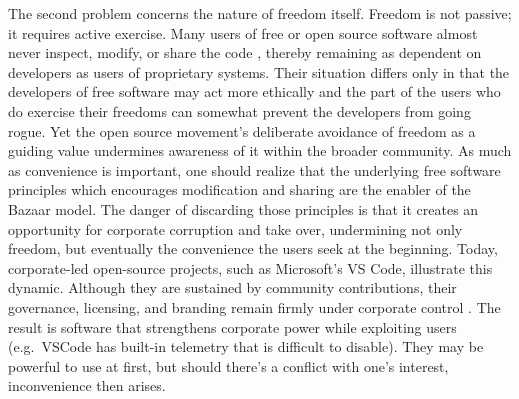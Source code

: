 \documentclass[10pt]{article}
\begin{document}
The second problem concerns the nature of freedom itself. Freedom is not
passive; it requires active exercise. Many users of free or open source
software almost never inspect, modify, or share the code
\cite{open.source.contrib}, thereby remaining as dependent on developers as
users of proprietary systems. Their situation differs only in that the
developers of free software may act more ethically and the part of the users
who do exercise their freedoms can somewhat prevent the developers from going
rogue. Yet the open source movement's deliberate avoidance of freedom as a
guiding value undermines awareness of it within the broader community.  As much
as convenience is important, one should realize that the underlying free
software principles which encourages modification and sharing are the enabler
of the Bazaar model. The danger of discarding those principles is that it
creates an opportunity for corporate corruption and take over, undermining not
only freedom, but eventually the convenience the users seek at the beginning.
Today, corporate-led open-source projects, such as Microsoft's VS Code,
illustrate this dynamic. Although they are sustained by community
contributions, their governance, licensing, and branding remain firmly under
corporate control \cite{corporate.open.source, fake.open.source}.  The result
is software that strengthens corporate power while exploiting users (e.g.\
VSCode has built-in telemetry that is difficult to disable). They may be
powerful to use at first, but should there's a conflict with one's interest,
inconvenience then arises. 
\end{document}
